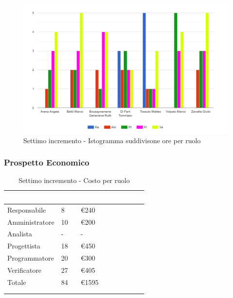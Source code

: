 {{      \begin{figure}[H]
        \includegraphics[width=15cm]{sezioni/images/settimo.png}
        \centering
        \caption{Settimo incremento - Istogramma suddivisone ore per ruolo}
     \end{figure}
    }

    \subsubsection{Prospetto Economico}
    {
        \setlength{\freewidth}{\dimexpr\textwidth-30\tabcolsep}
        \renewcommand{\arraystretch}{1.0}
        \setlength{\aboverulesep}{0pt}
        \setlength{\belowrulesep}{0pt}
        \begin{longtable}{C{.4\freewidth} C{.2\freewidth} C{.2\freewidth} C{.2\freewidth} C{.2\freewidth} C{.2\freewidth} C{.2\freewidth} C{.2\freewidth} C{.2\freewidth}}
          \toprule
        \textcolor{white}{\textbf{Ruolo}}&
        \textcolor{white}{\textbf{Ore}}&
        \textcolor{white}{\textbf{Costo}}\\
        \toprule
        \endhead
            
        Responsabile  & 8 & \euro240\\
        Amministratore  & 10 & \euro200 \\
        Analista &- & -\\
        Progettista &18 &\euro450\\
        Programmatore &20 & \euro300\\
        Verificatore &27 &\euro405\\
        Totale&84&\euro1595\\
        \bottomrule
      \\
        \caption{Settimo incremento - Costo per ruolo} 


\end{longtable}}}
